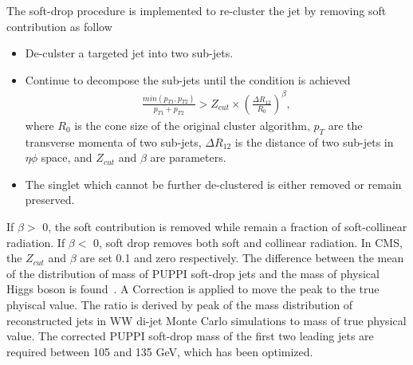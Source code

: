 The soft-drop procedure is implemented to re-cluster the jet by removing soft contribution as follow~\citep{Larkoski:2014wba}
\begin{itemize}
\item De-culster a targeted jet into two sub-jets.
\item Continue to decompose the sub-jets until the condition is achieved
\begin{equation} \label{eq5}
\begin{split}
\frac{min(p_{T1},p_{T2})}{p_{T1}+p_{T2}} > Z_{cut} \times (\frac{\Delta R_{12}}{R_0})^{\beta}, 
\end{split}
\end{equation}
where $R_0$ is the cone size of the original cluster algorithm, $p_T$ are the transverse momenta of two sub-jets, $\Delta R_{12}$ is the distance of two sub-jets in $\eta \phi$ space, and $Z_{cut}$ and $\beta $ are parameters. 
\item The singlet which cannot be further de-clustered is either removed or remain preserved.
\end{itemize} 
If $\beta  >$ 0, the soft contribution is removed while remain a fraction of soft-collinear radiation. 
If $\beta  <$ 0, soft drop removes both soft and collinear radiation.
In CMS, the $Z_{cut}$ and $\beta $ are set 0.1 and zero respectively.
The difference between the mean of the distribution of mass of PUPPI soft-drop jets and the mass of physical Higgs boson is found~\citep{CMS-AN-16-235}.
A Correction is applied to move the peak to the true phyiscal value. 
The ratio is derived by peak of the mass distribution of reconstructed jets in WW di-jet Monte Carlo simulations to mass of true physical value.
The corrected PUPPI soft-drop mass of the first two leading jets are required between 105 and 135 GeV, which has been optimized.
 
